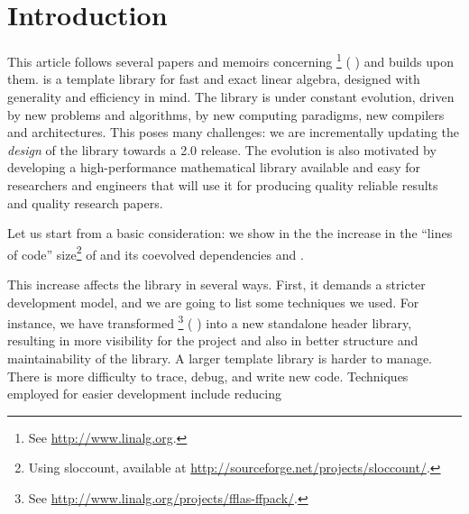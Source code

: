 \section{Introduction}
%
This article follows several papers and memoirs concerning \linbox%
%
\footnote{See \url{http://www.linalg.org}.}
%
(\cf{} \cite{Giorgi:2004:these,Turner:2002:these,Boyer:2012:these,Dumas:2002:icms,Dumas:2010:lbpar})
and builds upon them.
%
\linbox is a \cpp template library for fast and exact linear algebra, designed with generality
and efficiency in mind.
%
%
The \linbox library is under constant evolution, driven by new problems and
algorithms, by new computing paradigms, new compilers and architectures. This
poses many challenges: we are incrementally
updating the \emph{design} of the library towards a \textsf{2.0} release.
The evolution is also motivated by developing a high-performance mathematical
library available and easy for researchers and engineers that will use it for
producing quality reliable results and quality research papers.
%
\par
%
Let us start from a basic consideration: we show in the  the
increase in the ``lines of code'' size\footnote{Using \textsf{sloccount}, available at
\url{http://sourceforge.net/projects/sloccount/}.}
%
of \linbox and its coevolved dependencies \givaro and \fflasffpack.
%
%

%
This increase affects the library in several ways.  First, it demands a
stricter development model, and we are going to list some techniques we used.
For instance, we have transformed \fflasffpack %
%
\footnote{See \url{http://www.linalg.org/projects/fflas-ffpack/}.}
(\cf{} \cite{Dumas:2008:Flas}) into a new standalone header library, resulting
in more visibility for the \fflasffpack project
and also in better structure and maintainability of the library.
%
%
A larger template library is harder to manage. There is more difficulty
to trace, debug, and write new code. Techniques employed
for easier development include reducing
